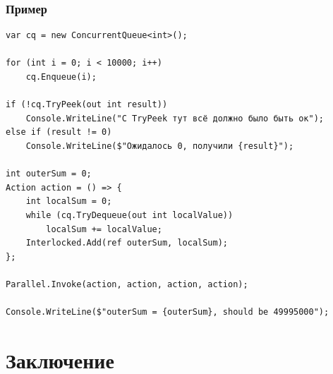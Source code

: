 \documentclass[xetex,mathserif,serif]{beamer}
\begin{document}
    \begin{frame}[fragile]
        \frametitle{Пример}
        \begin{scriptsize}
            \begin{verbatim}
var cq = new ConcurrentQueue<int>();

for (int i = 0; i < 10000; i++) 
    cq.Enqueue(i);

if (!cq.TryPeek(out int result))
    Console.WriteLine("С TryPeek тут всё должно было быть ок");
else if (result != 0)
    Console.WriteLine($"Ожидалось 0, получили {result}");

int outerSum = 0;
Action action = () => {
    int localSum = 0;
    while (cq.TryDequeue(out int localValue)) 
        localSum += localValue;
    Interlocked.Add(ref outerSum, localSum);
};

Parallel.Invoke(action, action, action, action);

Console.WriteLine($"outerSum = {outerSum}, should be 49995000");
            \end{verbatim}
        \end{scriptsize}
    \end{frame}

    \section{Заключение}
\end{document}
